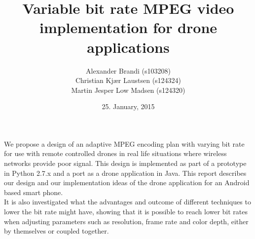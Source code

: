 \documentclass[12pt]{report}
\title{Variable bit rate MPEG video implementation for drone applications}
\date{25. January, 2015}
\author{Alexander Brandi (s103208)\\
Christian Kjær Laustsen (s124324)\\
Martin Jesper Low Madsen (s124320)}
\begin{document}
\maketitle

\begin{Abstract}
We propose a design of an adaptive MPEG encoding plan with varying bit rate for use with remote controlled drones in real life situations where wireless networks provide poor signal. This design is implemented as part of a prototype in Python 2.7.x and a port as a drone application in Java. This report describes our design and our implementation ideas of the drone application for an Android based smart phone.\\

It is also investigated what the advantages and outcome of different techniques to lower the bit rate might have, showing that it is possible to reach lower bit rates when adjusting parameters such as resolution, frame rate and color depth, either by themselves or coupled together.
\end{Abstract}


\newpage
{}


\end{document}

